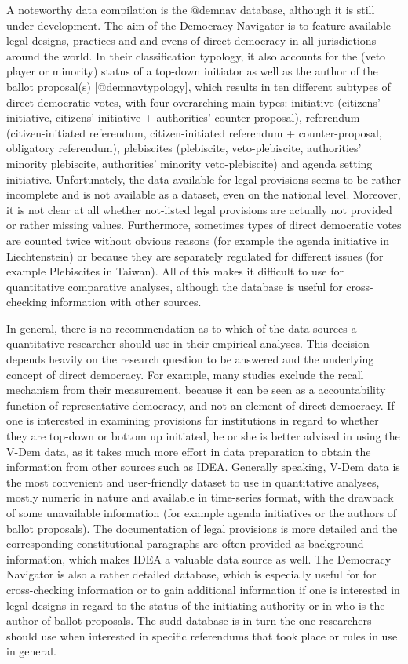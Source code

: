 \documentclass{systats}
\begin{document}
A noteworthy data compilation is the @demnav database, although it is still under development. The aim of the Democracy Navigator is to feature available legal designs, practices and and evens of direct democracy in all jurisdictions around the world.  In their classification typology, it also accounts for the (veto player or minority) status of a top-down initiator as well as the author of the ballot proposal(s) [@demnavtypology], which results in ten different subtypes of direct democratic votes, with four overarching main types: initiative (citizens' initiative, citizens' initiative + authorities' counter-proposal), referendum (citizen-initiated referendum, citizen-initiated referendum + counter-proposal, obligatory referendum), plebiscites (plebiscite, veto-plebiscite, authorities' minority plebiscite, authorities' minority veto-plebiscite) and agenda setting initiative. Unfortunately, the data available for legal provisions seems to be rather incomplete and is not available as a dataset, even on the national level. Moreover, it is not clear at all whether not-listed legal provisions are actually not provided or rather missing values. Furthermore, sometimes types of direct democratic votes are counted twice without obvious reasons (for example the agenda initiative in Liechtenstein) or because they are separately regulated for different issues (for example Plebiscites in Taiwan). All of this makes it difficult to use for quantitative comparative analyses, although the database is useful for cross-checking information with other sources.  

In general, there is no recommendation as to which of the data sources a quantitative researcher should use in their empirical analyses. This decision depends heavily on the research question to be answered and the underlying concept of direct democracy. For example, many studies exclude the recall mechanism from their measurement, because it can be seen as a accountability function of representative democracy, and not an element of direct democracy. If one is interested in examining provisions for institutions in regard to whether they are top-down or bottom up initiated, he or she is better advised in using the V-Dem data, as it takes much more effort in data preparation to obtain the information from other sources such as IDEA. Generally speaking, V-Dem data is the most convenient and user-friendly dataset to use in quantitative analyses, mostly numeric in nature and available in time-series format, with the drawback of some unavailable information (for example agenda initiatives or the authors of ballot proposals). The documentation of legal provisions is more detailed and the corresponding constitutional paragraphs are often provided as background information, which makes IDEA a valuable data source  as well. The Democracy Navigator is also a rather detailed database, which is especially useful for for cross-checking information or to gain additional information if one is interested in legal designs in regard to the status of the initiating authority or in who is the author of ballot proposals. The sudd database is in turn the one researchers should use when interested in specific referendums that took place or rules in use in general. 
\end{document}
